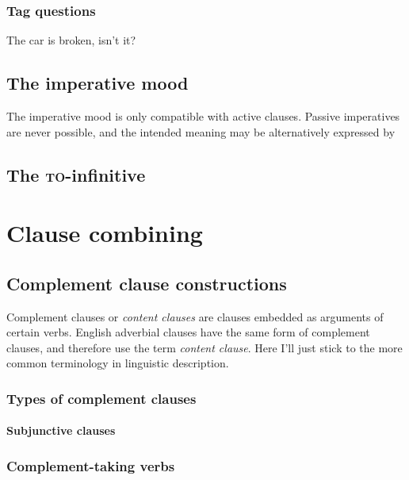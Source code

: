 \documentclass[UTF8, a4paper, oneside, scheme=plain]{ctexrep}
\newcommand*{\term}[1]{\emph{#1}}
\newcommand{\corpuscat}[1]{\textsc{#1}}
\begin{document}
\subsection{Tag questions}

\begin{exe}
    \ex The car is broken, isn't it?
\end{exe}

\section{The imperative mood}

The imperative mood is only compatible with active clauses.
Passive imperatives are never possible, 
and the intended meaning may be alternatively expressed by 

\section{The \corpuscat{to}-infinitive}

\chapter{Clause combining}\label{chap:clause-combining}

\section{Complement clause constructions}\label{sec:clause-combining.complement-clause}

Complement clauses or \term{content clauses} \citep{cgel} are clauses embedded as arguments of certain verbs.
English adverbial clauses have the same form of complement clauses,
and therefore \citet{cgel} use the term \term{content clause}.
Here I'll just stick to the more common terminology in linguistic description.

\subsection{Types of complement clauses}

\subsubsection{Subjunctive clauses}\label{sec:complement.subjunctive}

\subsection{Complement-taking verbs}
\end{document}
